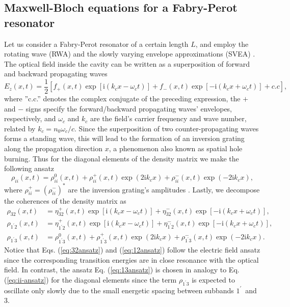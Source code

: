 \documentclass[10pt,letterpaper]{article}%
\begin{document}
\subsection{Maxwell-Bloch equations for a Fabry-Perot resonator}

\label{subsec:mbforfpresonator} Let us consider a Fabry-Perot resonator of a
certain length $L$, and employ the rotating wave (RWA) and the slowly varying
envelope approximations (SVEA) \cite{boyd2003nonlinear,gordon2008multimode}.
The optical field inside the cavity can be written as a superposition of
forward and backward propagating waves
\begin{equation}
E_{z}(x,t)=\frac{1}{2}\left[  f_{+}(x,t)\exp\left[  \mathrm{i}(k_{c}%
x-\omega_{c}t)\right]  +f_{-}(x,t)\exp\left[  -\mathrm{i}(k_{c}x+\omega
_{c}t)\right]  +c.c\right]  , \label{eq:e-ansatz}%
\end{equation}
where ''c.c.'' denotes the complex conjugate of the preceding expression, the
$+$ and $-$ signs specify the forward/backward propagating waves' envelopes,
respectively, and $\omega_{c}$ and $k_{c}$ are the field's carrier frequency
and wave number, related by $k_{c}=n_{0}\omega_{c}/c$. Since the superposition
of two counter-propagating waves forms a standing wave, this will lead to the
formation of an inversion grating along the propagation direction $x$, a
phenomenon also known as spatial hole burning. Thus for the diagonal elements
of the density matrix we make the following ansatz
\begin{equation}
\rho_{ii}(x,t)=\rho_{ii}^{0}(x,t)+\rho_{ii}^{+}(x,t)\exp\left(  2\mathrm{i}%
k_{c}x\right)  +\rho_{ii}^{-}(x,t)\exp\left(  -2\mathrm{i}k_{c}x\right)  ,
\label{eq:ii-ansatz}%
\end{equation}
where $\rho_{ii}^{+}=(\rho_{ii}^{-})^{\ast}$ are the inversion grating's
amplitudes \cite{wang2007coherent}. Lastly, we decompose the coherences of the
density matrix as
\begin{subequations}
\label{eq:cohansatz}%
\begin{align}
\rho_{32}(x,t)  &  =\eta_{32}^{+}(x,t)\exp\left[  \mathrm{i}(k_{c}x-\omega
_{c}t)\right]  +\eta_{32}^{-}(x,t)\exp\left[  -\mathrm{i}(k_{c}x+\omega
_{c}t)\right]  ,\label{eq:32ansatz}\\
\rho_{1^{\prime}2}(x,t)  &  =\eta_{1^{\prime}2}^{+}(x,t)\exp\left[
\mathrm{i}(k_{c}x-\omega_{c}t)\right]  +\eta_{1^{\prime}2}^{-}(x,t)\exp\left[
-\mathrm{i}(k_{c}x+\omega_{c}t)\right]  ,\label{eq:12ansatz}\\
\rho_{1^{\prime}3}(x,t)  &  =\rho_{1^{\prime}3}^{0}(x,t)+\rho_{1^{\prime}%
3}^{+}(x,t)\exp\left(  2\mathrm{i}k_{c}x\right)  +\rho_{1^{\prime}3}%
^{-}(x,t)\exp\left(  -2\mathrm{i}k_{c}x\right)  . \label{eq:13ansatz}%
\end{align}
\end{subequations}
Notice that Eqs. (\ref{eq:32ansatz}) and (\ref{eq:12ansatz}) follow the
electric field ansatz since the corresponding transition energies are in close
resonance with the optical field. In contrast, the ansatz Eq.
(\ref{eq:13ansatz}) is chosen in analogy to Eq. (\ref{eq:ii-ansatz}) for the
diagonal elements since the term $\rho_{1^{\prime}3}$ is expected to oscillate
only slowly due to the small energetic spacing between subbands $1^{\prime}%
$\ and $3$.
\end{document}
